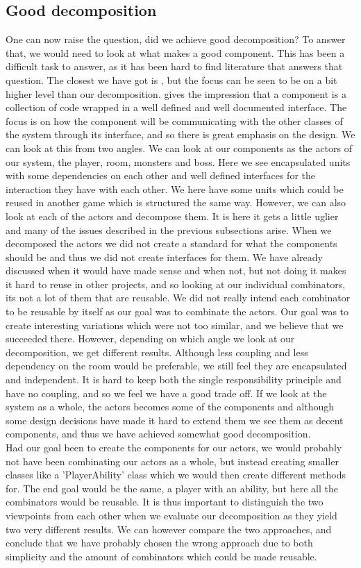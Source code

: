 \subsection{Good decomposition}
One can now raise the question, did we achieve good decomposition? To answer that, we would need to look at what makes a good component. This has been a difficult task to answer, as it has been hard to find literature that answers that question. The closest we have got is \cite{Components}, but the focus can be seen to be on a bit higher level than our decomposition. \cite{Components} gives the impression that a component is a collection of code wrapped in a well defined and well documented interface. The focus is on how the component will be communicating with the other classes of the system through its interface, and so there is great emphasis on the design. We can look at this from two angles. We can look at our components as the actors of our system, the player, room, monsters and boss. Here we see encapsulated units with some dependencies on each other and well defined interfaces for the interaction they have with each other. We here have some units which could be reused in another game which is structured the same way. However, we can also look at each of the actors and decompose them. It is here it gets a little uglier and many of the issues described in the previous subsections arise. When we decomposed the actors we did not create a standard for what the components should be and thus we did not create interfaces for them. We have already discussed when it would have made sense and when not, but not doing it makes it hard to reuse in other projects, and so looking at our individual combinators, its not a lot of them that are reusable. We did not really intend each combinator to be reusable by itself as our goal was to combinate the actors. Our goal was to create interesting variations which were not too similar, and we believe that we succeeded there. However, depending on which angle we look at our decomposition, we get different results. Although less coupling and less dependency on the room would be preferable, we still feel they are encapsulated and independent. It is hard to keep both the single responsibility principle and have no coupling, and so we feel we have a good trade off. If we look at the system as a whole, the actors becomes some of the components and although some design decisions have made it hard to extend them we see them as decent components, and thus we have achieved somewhat good decomposition.\\
Had our goal been to create the components for our actors, we would probably not have been combinating our actors as a whole, but instead creating smaller classes like a 'PlayerAbility' class which we would then create different methods for. The end goal would be the same, a player with an ability, but here all the combinators would be reusable. It is thus important to distinguish the two viewpoints from each other when we evaluate our decomposition as they yield two very different results. We can however compare the two approaches, and conclude that we have probably chosen the wrong approach due to both simplicity and the amount of combinators which could be made reusable.